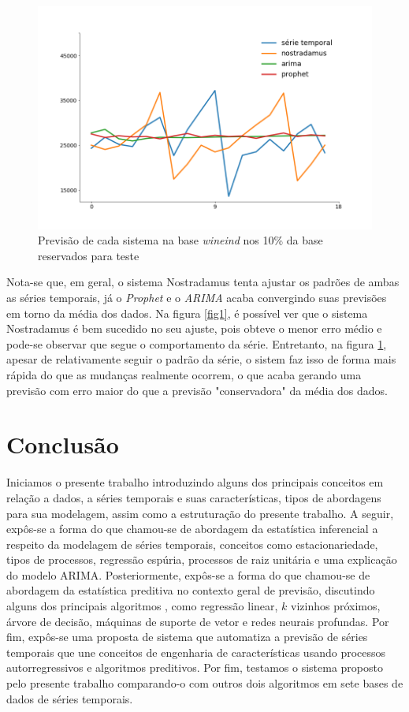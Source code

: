\documentclass[twocolumn]{rbef}
\newcommand{\1}{\mathbbm{1}}
\begin{document}
\begin{figure}[!htb]
	\centering \includegraphics[scale=0.3]{fig2.png}
	\caption{Previsão de cada sistema na base \textit{wineind} nos 10\% da base reservados para teste}
	\label{fig2}
\end{figure}

Nota-se que, em geral, o sistema Nostradamus tenta ajustar os padrões de ambas as séries temporais, já o \textit{Prophet} e o \textit{ARIMA} acaba convergindo suas previsões em torno da média dos dados. Na figura \ref{fig1}, é possível ver que o sistema Nostradamus é bem sucedido no seu ajuste, pois obteve o menor erro médio e pode-se observar que segue o comportamento da série. Entretanto, na figura \ref{fig2}, apesar de relativamente seguir o padrão da série, o sistem faz isso de forma mais rápida do que as mudanças realmente ocorrem, o que acaba gerando uma previsão com erro maior do que a previsão "conservadora" da média dos dados.

\section{Conclusão}

Iniciamos o presente trabalho introduzindo alguns dos principais conceitos em relação a dados, a séries temporais e suas características, tipos de abordagens para sua modelagem, assim como a estruturação do presente trabalho. A seguir, expôs-se a forma do que chamou-se de abordagem da estatística inferencial a respeito da modelagem de séries temporais, conceitos como estacionariedade, tipos de processos, regressão espúria, processos de raiz unitária e uma explicação do modelo ARIMA. Posteriormente, expôs-se a forma do que chamou-se de abordagem da estatística preditiva no contexto geral de previsão, discutindo alguns dos principais algoritmos , como regressão linear, $k$ vizinhos próximos, árvore de decisão, máquinas de suporte de vetor e redes neurais profundas. Por fim, expôs-se uma proposta de sistema que automatiza a previsão de séries temporais que une conceitos de engenharia de características usando processos autorregressivos e algoritmos preditivos. Por fim, testamos o sistema proposto pelo presente trabalho comparando-o com outros dois algoritmos em sete bases de dados de séries temporais.
\end{document}
